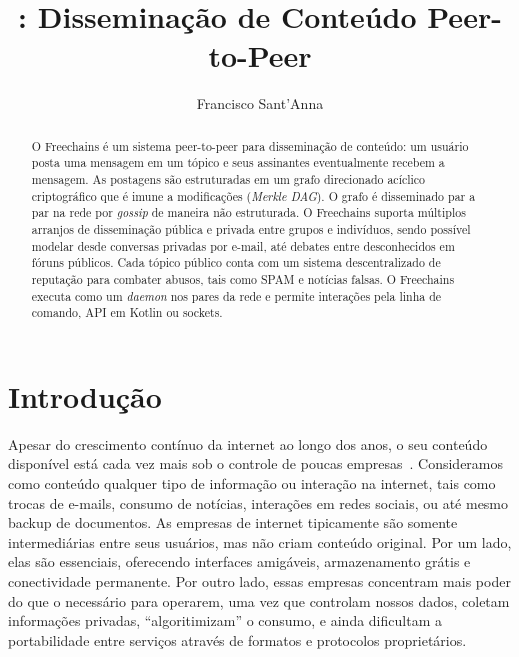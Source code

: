 \documentclass[12pt]{article}
\title{\FC: Disseminação de Conteúdo Peer-to-Peer}
\author{Francisco Sant'Anna\inst{1}}
\newcommand{\FC} {Freechains\xspace}
\begin{document}
 

\maketitle

\begin{abstract}
O \FC é um sistema peer-to-peer para disseminação de conteúdo: um
usuário posta uma mensagem em um tópico e seus assinantes eventualmente recebem
a mensagem.
As postagens são estruturadas em um grafo direcionado acíclico criptográfico
que é imune a modificações (\emph{Merkle DAG}).
O grafo é disseminado par a par na rede por \emph{gossip} de maneira não
estruturada.
O \FC suporta múltiplos arranjos de disseminação pública e privada entre grupos
e indivíduos, sendo possível modelar desde conversas privadas por e-mail, até
debates entre desconhecidos em fóruns públicos.
Cada tópico público conta com um sistema descentralizado de reputação para
combater abusos, tais como SPAM e notícias falsas.
O \FC executa como um \emph{daemon} nos pares da rede e permite
interações pela linha de comando, API em Kotlin ou sockets.
\end{abstract}
     

\section{Introdução}

Apesar do crescimento contínuo da internet ao longo dos anos, o seu conteúdo
disponível está cada vez mais sob o controle de poucas
empresas~\cite{internet.fixing}.
Consideramos como conteúdo qualquer tipo de informação ou interação na
internet, tais como trocas de e-mails, consumo de notícias, interações em redes
sociais, ou até mesmo backup de documentos.
%
As empresas de internet tipicamente são somente intermediárias entre seus
usuários, mas não criam conteúdo original.
Por um lado, elas são essenciais, oferecendo interfaces amigáveis,
armazenamento grátis e conectividade permanente.
Por outro lado, essas empresas concentram mais poder do que o necessário para
operarem, uma vez que controlam nossos dados, coletam informações privadas,
``algoritimizam'' o consumo, e ainda dificultam a portabilidade entre serviços
através de formatos e protocolos proprietários.
\end{document}
